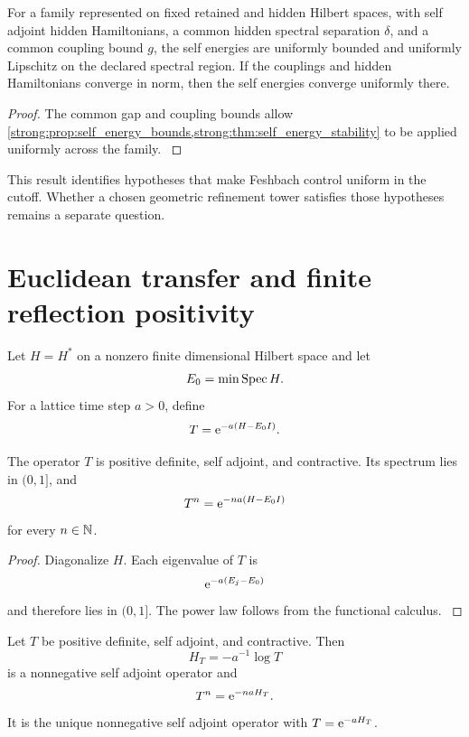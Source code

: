 \begin{corollary}\label{strong:corollary:013}\label{strong:cor:uniform_feshbach}
For a family represented on fixed retained and hidden Hilbert spaces, with self adjoint hidden Hamiltonians, a common hidden spectral separation \(\delta\), and a common coupling bound \(g\), the self energies are uniformly bounded and uniformly Lipschitz on the declared spectral region. If the couplings and hidden Hamiltonians converge in norm, then the self energies converge uniformly there.
\end{corollary}

\begin{proof}\label{strong:proof:055}
The common gap and coupling bounds allow \cref{strong:prop:self_energy_bounds,strong:thm:self_energy_stability} to be applied uniformly across the family.
\label{strong:proof:055:end}\end{proof}

This result identifies hypotheses that make Feshbach control uniform in the cutoff. Whether a chosen geometric refinement tower satisfies those hypotheses remains a separate question.

\section{Euclidean transfer and finite reflection positivity}\label{strong:section:010}\label{strong:sec:euclidean}

Let \(H=H^*\) on a nonzero finite dimensional Hilbert space and let
\[
E_0=\min\operatorname{Spec} H.
\]
For a lattice time step \(a>0\), define
\[
T=\e^{-a(H-E_0I)}.
\]

\begin{theorem}\label{strong:theorem:036}\label{strong:thm:euclidean_transfer}
The operator \(T\) is positive definite, self adjoint, and contractive. Its spectrum lies in \((0,1]\), and
\[
T^n=\e^{-na(H-E_0I)}
\]
for every \(n\in\NN\).
\end{theorem}

\begin{proof}\label{strong:proof:056}
Diagonalize \(H\). Each eigenvalue of \(T\) is
\[
\e^{-a(E_j-E_0)}
\]
and therefore lies in \((0,1]\). The power law follows from the functional calculus.
\label{strong:proof:056:end}\end{proof}

\begin{theorem}\label{strong:theorem:037}\label{strong:thm:transfer_logarithm}
Let \(T\) be positive definite, self adjoint, and contractive. Then
\[
H_T=-a^{-1}\log T
\]
is a nonnegative self adjoint operator and
\[
T^n=\e^{-naH_T}.
\]
It is the unique nonnegative self adjoint operator with \(T=\e^{-aH_T}\).
\end{theorem}


